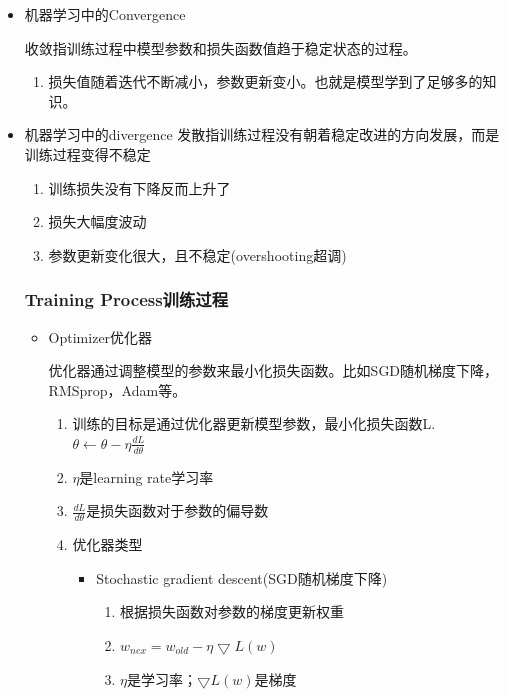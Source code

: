 \documentclass[UTF8]{ctexart}
\begin{document}
\begin{itemize}
    \item 机器学习中的Convergence
    
    收敛指训练过程中模型参数和损失函数值趋于稳定状态的过程。

    \begin{enumerate}
        \item 损失值随着迭代不断减小，参数更新变小。也就是模型学到了足够多的知识。
    \end{enumerate}

    \item 机器学习中的divergence
    发散指训练过程没有朝着稳定改进的方向发展，而是训练过程变得不稳定
    \begin{enumerate}
        \item 训练损失没有下降反而上升了
        \item 损失大幅度波动
        \item 参数更新变化很大，且不稳定(overshooting超调)
    \end{enumerate}

\subsubsection{Training Process训练过程}

\begin{itemize}
    \item Optimizer优化器
    
    优化器通过调整模型的参数来最小化损失函数。比如SGD随机梯度下降，RMSprop，Adam等。

    \begin{enumerate}
        \item 训练的目标是通过优化器更新模型参数，最小化损失函数L.$\theta\leftarrow \theta-\eta \frac{dL}{d \theta}$
        \item $\eta$是learning rate学习率 
        \item $\frac{dL}{d \theta} $是损失函数对于参数的偏导数
        \item 优化器类型
        \begin{itemize}
            \item Stochastic gradient descent(SGD随机梯度下降)
            
            \begin{enumerate}
                \item 根据损失函数对参数的梯度更新权重
                \item $w_{nex}=w_{old}-\eta \bigtriangledown L(w)$
                \item $\eta$是学习率；$\bigtriangledown L(w)$是梯度
            \end{enumerate}


\end{itemize}
\end{enumerate}
\end{itemize}
\end{itemize}
\end{document}
